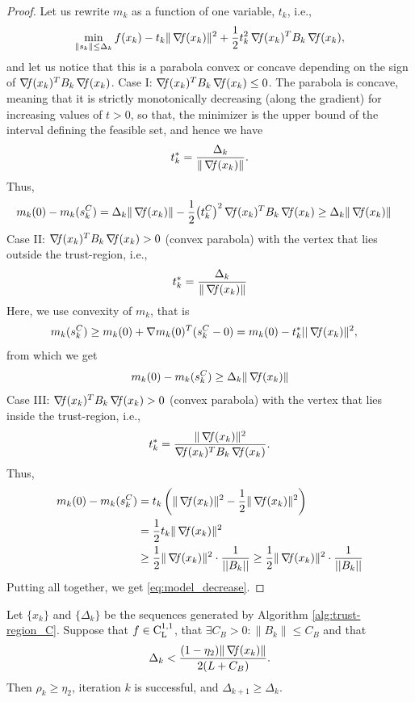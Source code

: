 \documentclass[10pt,a4paper]{article}
\begin{document}
\begin{proof}
	Let us rewrite $m_k$ as a function of one variable, $t_k$, i.e., 
	$$\min_{\|s_k\| \leq \Delta_k} f(x_k) -t_k \|\operatorname*{\mathit{\nabla \!f}}(x_k)\|^2 + \frac{1}{2}t_k^2\operatorname*{\mathit{\nabla \!f}}(x_k)^T B_k\operatorname*{\mathit{\nabla \!f}}(x_k),$$
	and let us notice that this is a parabola convex or concave depending on the sign of $\operatorname*{\mathit{\nabla \!f}}(x_k)^T B_k\operatorname*{\mathit{\nabla \!f}}(x_k)$. 
	Case I: $\operatorname*{\mathit{\nabla \!f}}(x_k)^T B_k \operatorname*{\mathit{\nabla \!f}}(x_k) \leq 0$. The parabola is concave, meaning that it is strictly monotonically decreasing (along the gradient) for increasing values of $t > 0$, so that, the minimizer is the upper bound of the interval defining the feasible set, and hence we have
	\begin{equation*}
		t^*_k = \frac{\Delta_k}{\|\operatorname*{\mathit{\nabla \!f}}(x_k)\|}.
	\end{equation*}
Thus, 
\begin{align*}
	m_k(0) - m_k(s_k^C) & = \Delta_k \|\operatorname*{\mathit{\nabla \!f}}(x_k)\| - \frac{1}{2}{\left(t_k^C\right)}^2\operatorname*{\mathit{\nabla \!f}}(x_k)^T B_k\operatorname*{\mathit{\nabla \!f}}(x_k) \geq \Delta_k \|\operatorname*{\mathit{\nabla \!f}}(x_k)\|
\end{align*}
	Case II: $\operatorname*{\mathit{\nabla \!f}}(x_k)^T B_k \operatorname*{\mathit{\nabla \!f}}(x_k) > 0$ (convex parabola) with the vertex that lies outside the trust-region, i.e., 
	\begin{equation*}
		t^*_k = \frac{\Delta_k}{\|\operatorname*{\mathit{\nabla \!f}}(x_k)\|}
	\end{equation*}
Here, we use convexity of $m_k$, that is 
\begin{align*}
	m_k(s_k^C) & \geq m_k(0) + \nabla m_k(0)^T(s_k^C-0) = m_k(0) - t_k^*||\operatorname*{\mathit{\nabla \!f}}(x_k)\|^2,
\end{align*}
from which we get 
$$m_k(0) - m_k(s_k^C) \geq \Delta_k \|\operatorname*{\mathit{\nabla \!f}}(x_k)\|$$
Case III: $\operatorname*{\mathit{\nabla \!f}}(x_k)^T B_k \operatorname*{\mathit{\nabla \!f}}(x_k) > 0$ (convex parabola) with the vertex that lies inside the trust-region, i.e., 
$$t^*_k = \frac{\|\operatorname*{\mathit{\nabla \!f}}(x_k)\|^2}{\operatorname*{\mathit{\nabla \!f}}(x_k)^T B_k \operatorname*{\mathit{\nabla \!f}}(x_k)}.$$
Thus, 
\begin{align*}
	m_k(0) - m_k(s_k^C) &=  t_k \left(\|\operatorname*{\mathit{\nabla \!f}}(x_k)\|^2 - \frac{1}{2} \|\operatorname*{\mathit{\nabla \!f}}(x_k)\|^2 \right)\\
	& = \frac{1}{2} t_k \|\operatorname*{\mathit{\nabla \!f}}(x_k)\|^2\\
	&\geq \frac{1}{2} \|\operatorname*{\mathit{\nabla \!f}}(x_k)\|^2 \cdot \frac{1}{||B_k||}\geq \frac{1}{2} \|\operatorname*{\mathit{\nabla \!f}}(x_k)\|^2 \cdot \frac{1}{||B_k||}
\end{align*}
Putting all together, we get \eqref{eq:model_decrease}.
\end{proof}

\begin{lemma}
	Let $\{x_k\}$ and $\{\Delta_k\}$ be the sequences generated by Algorithm \ref{alg:trust-region_C}. Suppose that $f\in \mathord{\mathrm{C^{1,1}_{L}}}$, that $\exists C_B>0: \|B_k\| \leq C_B$ and that
	\begin{equation}\label{eq:successful_condition}
		\Delta_k < \frac{(1 - \eta_2)\|\operatorname*{\mathit{\nabla \!f}}(x_k)\|}{2(L + C_B)}.
	\end{equation}
	Then $\rho_k \geq \eta_2$, iteration $k$ is successful, and $\Delta_{k+1} \geq \Delta_k$.
\end{lemma}
\end{document}
